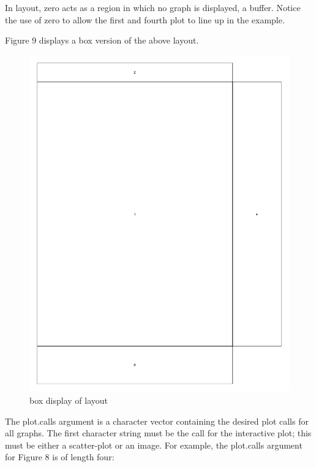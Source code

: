 \documentclass[]{article}
\begin{document}
 In layout, zero acts as a region in which no graph is displayed, a buffer. Notice the use of zero to allow the first and fourth plot to line up in the example.

\indent Figure 9 displays a box version of the above layout.
\begin{center}
\begin{figure}
\includegraphics{layoutFile}
\caption{box display of layout}
\end{figure}
\end{center}


\indent The plot.calls argument is a character vector containing the desired plot calls for all graphs. The first character string must be the call for the interactive plot; this must be either a scatter-plot or an image. For example, the plot.calls argument for Figure 8 is of length four: 
\end{document}
